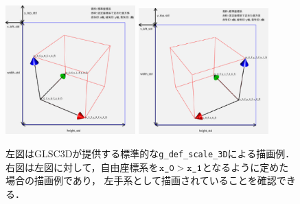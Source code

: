 \documentclass[platex,a4paper,12pt]{jsarticle}%
\begin{document}
\begin{figure}[htb]
\centering
\includegraphics[width=50mm]{g_def_scale.eps}
 \hspace{0.5zw}
\includegraphics[width=50mm]{g_def_scale_left_hand.eps}

\begin{flushleft}
左図はGLSC3Dが提供する標準的な\verb|g_def_scale_3D|による描画例．
右図は左図に対して，自由座標系を$\verb|x_0| > \verb|x_1|$となるように定めた場合の描画例であり，
左手系として描画されていることを確認できる．
\end{flushleft}
\end{figure}
\end{document}
